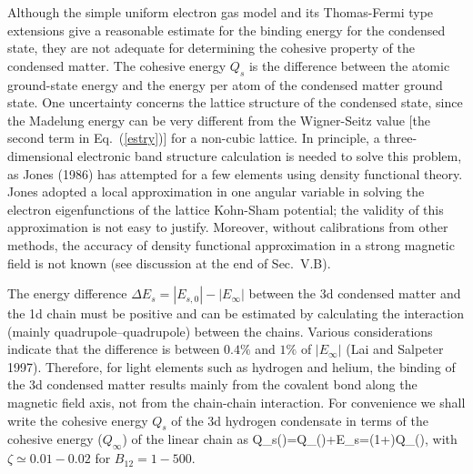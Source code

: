 Although the simple uniform electron gas model and its Thomas-Fermi
type extensions give a reasonable estimate for the 
binding energy for the condensed state, they are not adequate for determining
the cohesive property of the condensed matter. The cohesive energy $Q_s$
is the difference between the atomic ground-state energy and the energy per
atom of the condensed matter ground state. 
One uncertainty concerns the lattice structure of
the condensed state, since the Madelung energy can be very different from
the Wigner-Seitz value [the second term in Eq.~(\ref{estry})]
for a non-cubic lattice. In principle, a three-dimensional
electronic band structure calculation is needed to
solve this problem, as Jones (1986) has attempted 
for a few elements using density functional theory. Jones adopted
a local approximation in one angular variable in solving the electron
eigenfunctions of the lattice Kohn-Sham potential; the validity of this 
approximation is not easy to justify. Moreover, 
without calibrations from other methods, the accuracy of density
functional approximation in a strong magnetic field is not known
(see discussion at the end of Sec.~V.B).

The energy difference $\Delta E_s=|E_{s,0}|-|E_\infty|$ between the
3d condensed matter and the 1d chain must be positive 
and can be estimated by calculating the interaction (mainly 
quadrupole--quadrupole) between the chains. Various considerations indicate
that the difference is between $0.4\%$ and $1\%$ of $|E_\infty|$
(Lai and Salpeter 1997). Therefore, for light elements such as
hydrogen and helium, the binding of the 3d condensed matter 
results mainly from the covalent bond along the magnetic field axis, 
not from the chain-chain interaction. For convenience we shall write
the cohesive energy $Q_s$ of the 3d hydrogen condensate in terms of the
cohesive energy ($Q_\infty$) of the linear chain as 
\be
Q_s(\rH)=Q_\infty(\rH)+\Delta E_s=(1+\zeta)Q_\infty(\rH),
\ee
with $\zeta\simeq 0.01-0.02$ for $B_{12}=1-500$. 

